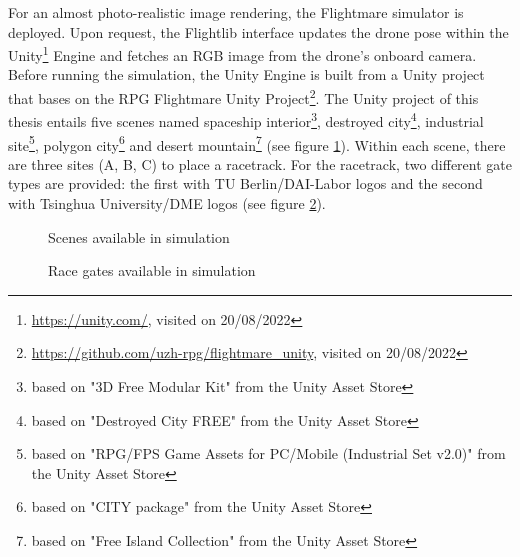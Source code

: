 For an almost photo-realistic image rendering,
the Flightmare \cite{Song2020} simulator 
is deployed.
Upon request, the Flightlib interface
updates the drone pose 
within the Unity\footnote{
    \url{https://unity.com/}, visited on 20/08/2022
} Engine
and fetches an RGB image from the drone's onboard camera.
Before running the simulation,
the Unity Engine is built from a Unity project
that bases on the RPG Flightmare Unity Project\footnote{
    \url{https://github.com/uzh-rpg/flightmare_unity}, visited on 20/08/2022
}.
The Unity project of this thesis
entails five scenes named
spaceship interior\footnote{
    based on "3D Free Modular Kit" from the Unity Asset Store
},
destroyed city\footnote{
    based on "Destroyed City FREE" from the Unity Asset Store
},
industrial site\footnote{
    based on "RPG/FPS Game Assets for PC/Mobile (Industrial Set v2.0)" from the Unity Asset Store
},
polygon city\footnote{
    based on "CITY package" from the Unity Asset Store
}
and desert mountain\footnote{
    based on "Free Island Collection" from the Unity Asset Store
}
(see figure \ref{fig:unity_scenes}).
Within each scene, there are three sites (A, B, C) to place a racetrack.
For the racetrack, two different gate types are provided:
the first with TU Berlin/DAI-Labor logos and 
the second with Tsinghua University/DME logos
(see figure \ref{fig:unity_gates}).
\begin{figure}
    \centering
    \par
    \caption[
        Scenes available in simulation
    ]{
        Scenes available in simulation
        \label{fig:unity_scenes}
    }
\end{figure}
\begin{figure}[h]
    \centering
    \caption[
        Race gates available in simulation
    ]{
        Race gates available in simulation
        \label{fig:unity_gates}
    }
\end{figure}

